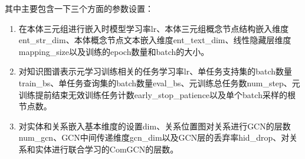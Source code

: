 
其中主要包含一下三个方面的参数设置：
\begin{enumerate}[label=\arabic*)]
\item 在本体三元组进行嵌入时模型学习率lr、本体三元组概念节点结构嵌入维度ent\_str\_dim、本体概念节点文本嵌入维度ent\_text\_dim、线性隐藏层维度mapping\_size以及训练的epoch数量和batch的大小。
\item 对知识图谱表示元学习训练相关的任务学习率lr、单任务支持集的batch数量train\_bs、单任务查询集的batch数量eval\_bs、元训练总任务数num\_step、元训练提前结束无效训练任务计数early\_stop\_patience以及单个batch采样的根节点数。
\item 对实体和关系嵌入基本维度的设置dim、关系位置图对关系进行GCN的层数num\_gcn、GCN中间传递维度gcn\_dim以及GCN层的丢弃率hid\_drop、对关系和实体进行联合学习的ComGCN的层数。
\end{enumerate}

